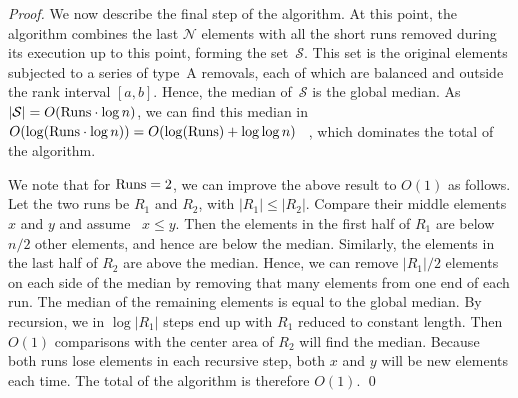 \begin{proof}
We now describe the final step of the algorithm.
At this point, the algorithm combines the last $\mathcal{N}$ elements
with all the short runs removed during its execution up to this point, forming the
set~$\mathcal{S}$. This set is the original elements
subjected to a series of type~A removals, each of which are balanced
and outside the rank interval $[a,b]$. Hence, the median
of~$\mathcal{S}$ is the global median. As
$|\mathcal{S}| = O(\mathrm{Runs} \cdot \log n)$, we can find this median in
$O(\log(\mathrm{Runs} \cdot \log n)) = O(\log (\mathrm{Runs}) + \log\log n)$
\frag~\cite{afshani:fragile-ESA19}, which dominates the total
\frag of the algorithm.

We note that for $\mathrm{Runs} = 2$, we can improve the above result to
$O(1)$ \frag as follows. Let the two runs be $R_1$ and $R_2$, with
$|R_1| \le |R_2|$.  Compare their middle elements $x$ and $y$ and
assume \ $x \le y$. Then the elements in the first half of $R_1$ are
below $n/2$ other elements, and hence are below the median. Similarly,
the elements in the last half of $R_2$ are above the median. Hence, we
can remove $|R_1|/2$ elements on each side of the median by removing
that many elements from one end of each run. The median of the
remaining elements is equal to the global median. By recursion, we in
$\log |R_1|$ steps end up with $R_1$ reduced to constant length. Then
$O(1)$ comparisons with the center area of $R_2$ will find the median.
Because both runs lose elements in each recursive step, both $x$ and
$y$ will be new elements each time. The total \frag of the
algorithm is therefore $O(1)$. \qed
\end{proof}

